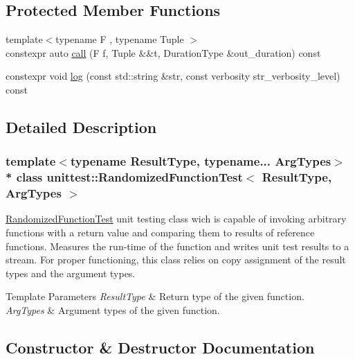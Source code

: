 \subsection*{Protected Member Functions}
\begin{DoxyCompactItemize}
\item 
{\footnotesize template$<$typename F , typename Tuple $>$ }\\constexpr auto \hyperlink{classunittest_1_1_randomized_function_test_a85df5b058e65c7c94e2bd79c52aa40e4}{call} (F f, Tuple \&\&t, Duration\+Type \&out\+\_\+duration) const 
\item 
constexpr void \hyperlink{classunittest_1_1_randomized_function_test_afac84faf5c7dd347ef03c3cd0e56b57d}{log} (const std\+::string \&str, const verbosity str\+\_\+verbosity\+\_\+level) const 
\end{DoxyCompactItemize}


\subsection{Detailed Description}
\subsubsection*{template$<$typename Result\+Type, typename... Arg\+Types$>$\\*
class unittest\+::\+Randomized\+Function\+Test$<$ Result\+Type, Arg\+Types $>$}

\hyperlink{classunittest_1_1_randomized_function_test}{Randomized\+Function\+Test} unit testing class wich is capable of invoking arbitrary functions with a return value and comparing them to results of reference functions. Measures the run-\/time of the function and writes unit test results to a stream. For proper functioning, this class relies on copy assignment of the result types and the argument types. 
\begin{DoxyTemplParams}{Template Parameters}
{\em Result\+Type} & Return type of the given function. \\
\hline
{\em Arg\+Types} & Argument types of the given function. \\
\hline
\end{DoxyTemplParams}


\subsection{Constructor \& Destructor Documentation}
